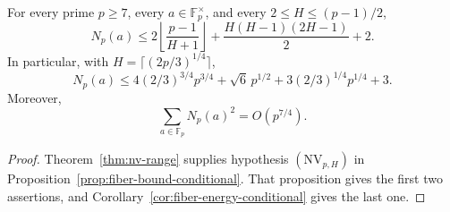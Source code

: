 \begin{corollary}
\label{cor:fiber-bound-unconditional}
For every prime $p\geq7$, every $a\in\mathbb F_p^\times$, and every
$2\leq H\leq(p-1)/2$,
\[
 N_p(a)
 \leq
 2\left\lfloor\frac{p-1}{H+1}\right\rfloor
 +\frac{H(H-1)(2H-1)}2+2.
\]
In particular, with $H=\lceil(2p/3)^{1/4}\rceil$,
\[
 N_p(a)
 \leq4(2/3)^{3/4}p^{3/4}
      +\sqrt6\,p^{1/2}
      +3(2/3)^{1/4}p^{1/4}+3.
\]
Moreover,
\[
 \sum_{a\in\mathbb F_p}N_p(a)^2=O(p^{7/4}).
\]
\end{corollary}

\begin{proof}
Theorem~\ref{thm:nv-range} supplies hypothesis
$(\mathrm{NV}_{p,H})$ in Proposition~\ref{prop:fiber-bound-conditional}.
That proposition gives the first two assertions, and
Corollary~\ref{cor:fiber-energy-conditional} gives the last one.
\end{proof}
